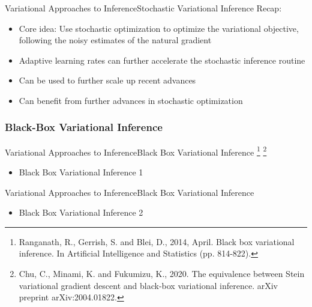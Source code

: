 \documentclass[AERbeamer%
              ,optEnglish%
              ,optBiber%
              ,optBibstyleAlphabetic%
              ,optBeamerClassicFormat%
              ]{AERlatex}%
\begin{document}
\begin{frame}[c]{Variational Approaches to Inference}{Stochastic Variational Inference}
    Recap:
    \begin{itemize}
        \item Core idea: Use stochastic optimization to optimize the variational objective, following the noisy
              estimates of the natural gradient
        \item Adaptive learning rates can further accelerate the stochastic inference routine
        \item Can be used to further scale up recent advances
        \item Can benefit from further advances in stochastic optimization
    \end{itemize}
\end{frame}



\subsubsection*{Black-Box Variational Inference}
\begin{frame}[c]{Variational Approaches to Inference}{Black Box Variational Inference \footnote{Ranganath, R., Gerrish, S. and Blei, D., 2014, April. Black box
                                                                                                variational inference. In Artificial Intelligence and Statistics (pp. 814-822).}
                                                                                      \footnote{Chu, C., Minami, K. and Fukumizu, K., 2020. The equivalence between Stein
                                                                                                variational gradient descent and black-box variational inference. arXiv preprint arXiv:2004.01822.}}
    \centering
    \begin{itemize}
        \item Black Box Variational Inference 1
    \end{itemize}
\end{frame}


\begin{frame}[c]{Variational Approaches to Inference}{Black Box Variational Inference}
    \centering
    \begin{itemize}
        \item Black Box Variational Inference 2
    \end{itemize}
\end{frame}
\end{document}

